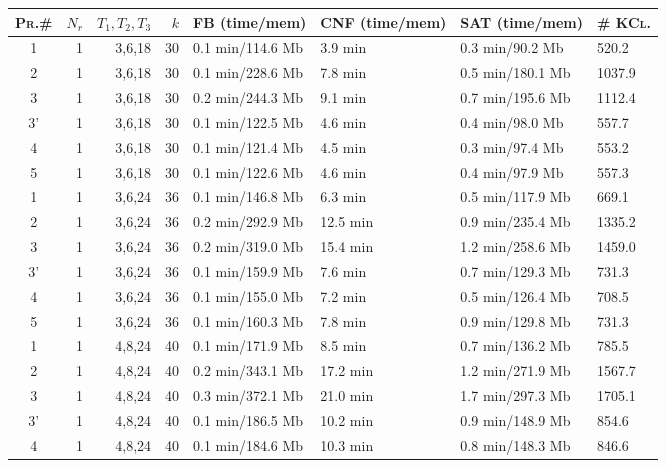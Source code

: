 \documentclass[a4paper]{article}
\theoremstyle{plain}
\theoremstyle{definition}
\begin{document}
\begin{table}[htbp]
\begin{center}
\begin{scriptsize}
\begin{tabular}{|c r r r l l l l|}
\hline
\textsc{Pr.\#} & $N_r$ & $T_1,T_2,T_3$  &  $k$  &  \textsc{FB} (time/mem)  &  \textsc{CNF} (time/mem) & \textsc{SAT} (time/mem) &  \textsc{\# KCl.} \\
\hline
1  &  1  &  3,6,18  &  30  &  0.1 min/114.6 Mb  &  3.9 min  &  0.3 min/90.2 Mb & 520.2 \\
2  &  1  &  3,6,18  &  30  &  0.1 min/228.6 Mb  &  7.8 min  &  0.5 min/180.1 Mb & 1037.9 \\
3  &  1  &  3,6,18  &  30  &  0.2 min/244.3 Mb  &  9.1 min  &  0.7 min/195.6 Mb & 1112.4 \\
3'  &  1  &  3,6,18  &  30  &  0.1 min/122.5 Mb  &  4.6 min  &  0.4 min/98.0 Mb & 557.7 \\
4  &  1  &  3,6,18  &  30  &  0.1 min/121.4 Mb  &  4.5 min  &  0.3 min/97.4 Mb & 553.2 \\
5  &  1  &  3,6,18  &  30  &  0.1 min/122.6 Mb  &  4.6 min  &  0.4 min/97.9 Mb & 557.3 \\
\hline
1  &  1  &  3,6,24  &  36  &  0.1 min/146.8 Mb  &  6.3 min  &  0.5 min/117.9 Mb & 669.1 \\
2  &  1  &  3,6,24  &  36  &  0.2 min/292.9 Mb  &  12.5 min  &  0.9 min/235.4 Mb & 1335.2 \\
3  &  1  &  3,6,24  &  36  &  0.2 min/319.0 Mb  &  15.4 min  &  1.2 min/258.6 Mb & 1459.0 \\
3'  &  1  &  3,6,24  &  36  &  0.1 min/159.9 Mb  &  7.6 min  &  0.7 min/129.3 Mb & 731.3 \\
4  &  1  &  3,6,24  &  36  &  0.1 min/155.0 Mb  &  7.2 min  &  0.5 min/126.4 Mb & 708.5 \\
5  &  1  &  3,6,24  &  36  &  0.1 min/160.3 Mb  &  7.8 min  &  0.9 min/129.8 Mb & 731.3 \\
\hline
1  &  1  &  4,8,24  &  40  &  0.1 min/171.9 Mb  &  8.5 min  &  0.7 min/136.2 Mb & 785.5 \\
2  &  1  &  4,8,24  &  40  &  0.2 min/343.1 Mb  &  17.2 min  &  1.2 min/271.9 Mb & 1567.7 \\
3  &  1  &  4,8,24  &  40  &  0.3 min/372.1 Mb  &  21.0 min  &  1.7 min/297.3 Mb & 1705.1 \\
3'  &  1  &  4,8,24  &  40  &  0.1 min/186.5 Mb  &  10.2 min  &  0.9 min/148.9 Mb & 854.6 \\
4  &  1  &  4,8,24  &  40  &  0.1 min/184.6 Mb  &  10.3 min  &  0.8 min/148.3 Mb & 846.6 \\

\end{tabular}
\end{scriptsize}
\end{center}
\end{table}
\end{document}
